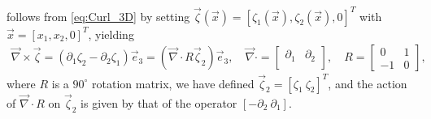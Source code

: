 \documentclass{cmslatex}
\begin{document}
follows from \eqref{eq:Curl_3D} by setting
$\vec{\zeta}(\vec{x})=[\zeta_1(\vec{x}),\zeta_2(\vec{x}),0]^T$ with
$\vec{x}=[x_1,x_2,0]^T$, yielding   
%
\begin{align}\label{eq:Curl_2D}
  \vec{\nabla}\times\vec{\zeta}=(\partial_1\zeta_2-\partial_2\zeta_1)\vec{e}_3
%  
%  
  =(\vec{\nabla}\cdot R\vec{\zeta}_2)\vec{e}_3,
%
  \quad
%  
  \vec{\nabla}\cdot
    =\left[
    \begin{array}{ccc}
       \partial_1  &   \partial_2 \\      
    \end{array}
  \right],
  \quad
  R=
  \left[
    \begin{array}{ccc}
        0  &  1  \\
       -1  &  0  
    \end{array}
  \right],
\end{align}
%
where $R$ is a $90^\circ$ rotation matrix, we have defined $\vec{\zeta}_2=[\zeta_1
\ \zeta_2]^T$, and the action of $\vec{\nabla}\cdot R$ on $\vec{\zeta}_2$ is given by that
of the operator $[ - \partial_2 \ \partial_1]$.
\end{document}
